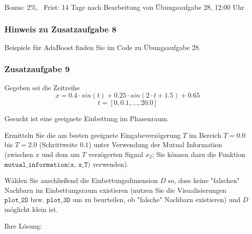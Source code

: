 \documentclass[11pt]{article}
\begin{document}
    Bonus: 2\%,\(\;\;\;\)Frist: 14 Tage nach Bearbeitung von Übungsaufgabe
28, 12:00 Uhr

\subsubsection{Hinweis zu Zusatzaufgabe
8}\label{hinweis-zu-zusatzaufgabe-8}

Beispiele für AdaBoost finden Sie im Code zu Übungsaufgabe 28.

\subsubsection{Zusatzaufgabe 9}\label{zusatzaufgabe-9}

Gegeben sei die Zeitreihe
\[x = 0.4 \cdot sin(t) + 0.25 \cdot sin(2 \cdot t + 1.5) + 0.65\]
\[t = [0, 0.1, ..., 20.0]\]

Gesucht ist eine geeignete Einbettung im Phasenraum.

Ermitteln Sie die am besten geeignete Eingabeverzögerung \(T\) im
Bereich \(T = 0.0\) bis \(T = 2.0\) (Schrittweite \(0.1\)) unter
Verwendung der Mutual Information (zwischen \(x\) und dem um \(T\)
verzögerten Signal \(x_2\); Sie können dazu die Funktion
\(\texttt{mutual_information(x, x_T)}\) verwenden).

Wählen Sie anschließend die Einbettungsdimension \(D\) so, dass keine
"falschen" Nachbarn im Einbettungsraum existieren (nutzen Sie die
Visualisierungen \(\texttt{plot_2D}\) bzw. \(\texttt{plot_3D}\) um zu
beurteilen, ob "falsche" Nachbarn existieren) und \(D\) möglicht klein
ist.

Ihre Lösung:
\end{document}
